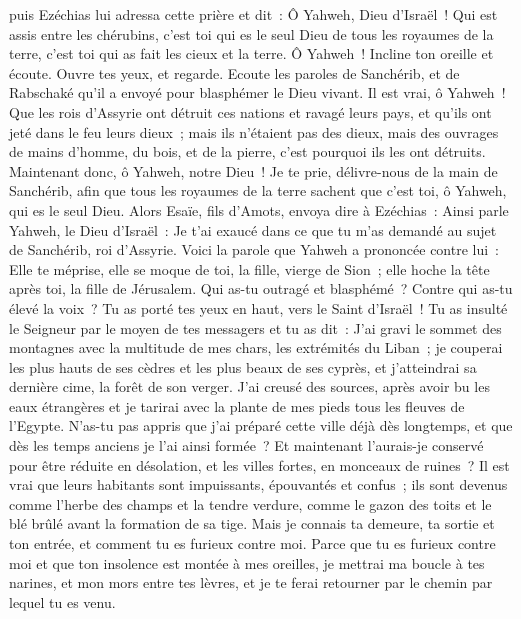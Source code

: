 \begin{multicols}{2}
puis Ezéchias lui adressa cette prière et dit~: Ô Yahweh, Dieu d'Israël~! Qui est assis entre les chérubins, c'est toi qui es le seul Dieu de tous les royaumes de la terre, c'est toi qui as fait les cieux et la terre.
Ô Yahweh~! Incline ton oreille et écoute. Ouvre tes yeux, et regarde. Ecoute les paroles de Sanchérib, et de Rabschaké qu'il a envoyé pour blasphémer le Dieu vivant.
Il est vrai, ô Yahweh~! Que les rois d'Assyrie ont détruit ces nations et ravagé leurs pays,
et qu'ils ont jeté dans le feu leurs dieux~; mais ils n'étaient pas des dieux, mais des ouvrages de mains d'homme, du bois, et de la pierre, c'est pourquoi ils les ont détruits.
Maintenant donc, ô Yahweh, notre Dieu~! Je te prie, délivre-nous de la main de Sanchérib, afin que tous les royaumes de la terre sachent que c'est toi, ô Yahweh, qui es le seul Dieu.
Alors Esaïe, fils d'Amots, envoya dire à Ezéchias~: Ainsi parle Yahweh, le Dieu d'Israël~: Je t'ai exaucé dans ce que tu m'as demandé au sujet de Sanchérib, roi d'Assyrie.
Voici la parole que Yahweh a prononcée contre lui~: Elle te méprise, elle se moque de toi, la fille, vierge de Sion~; elle hoche la tête après toi, la fille de Jérusalem.
Qui as-tu outragé et blasphémé~? Contre qui as-tu élevé la voix~? Tu as porté tes yeux en haut, vers le Saint d'Israël~!
Tu as insulté le Seigneur par le moyen de tes messagers et tu as dit~: J'ai gravi le sommet des montagnes avec la multitude de mes chars, les extrémités du Liban~; je couperai les plus hauts de ses cèdres et les plus beaux de ses cyprès, et j'atteindrai sa dernière cime, la forêt de son verger.
J'ai creusé des sources, après avoir bu les eaux étrangères et je tarirai avec la plante de mes pieds tous les fleuves de l'Egypte.
N'as-tu pas appris que j'ai préparé cette ville déjà dès longtemps, et que dès les temps anciens je l'ai ainsi formée~? Et maintenant l'aurais-je conservé pour être réduite en désolation, et les villes fortes, en monceaux de ruines~?
Il est vrai que leurs habitants sont impuissants, épouvantés et confus~; ils sont devenus comme l'herbe des champs et la tendre verdure, comme le gazon des toits et le blé brûlé avant la formation de sa tige.
Mais je connais ta demeure, ta sortie et ton entrée, et comment tu es furieux contre moi.
Parce que tu es furieux contre moi et que ton insolence est montée à mes oreilles, je mettrai ma boucle à tes narines, et mon mors entre tes lèvres, et je te ferai retourner par le chemin par lequel tu es venu.

\end{multicols}

